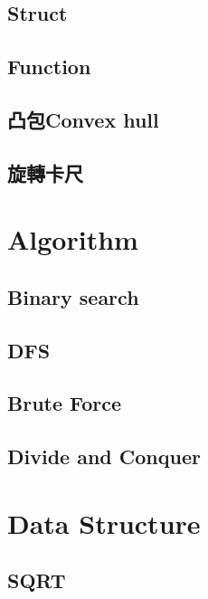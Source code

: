 \subsection{Struct}


\subsection{Function}


\subsection{凸包Convex hull}


\subsection{旋轉卡尺}


\section{Algorithm}

\subsection{Binary search}


\subsection{DFS}


\subsection{Brute Force}


\subsection{Divide and Conquer}


\section{Data Structure}

\subsection{SQRT}


